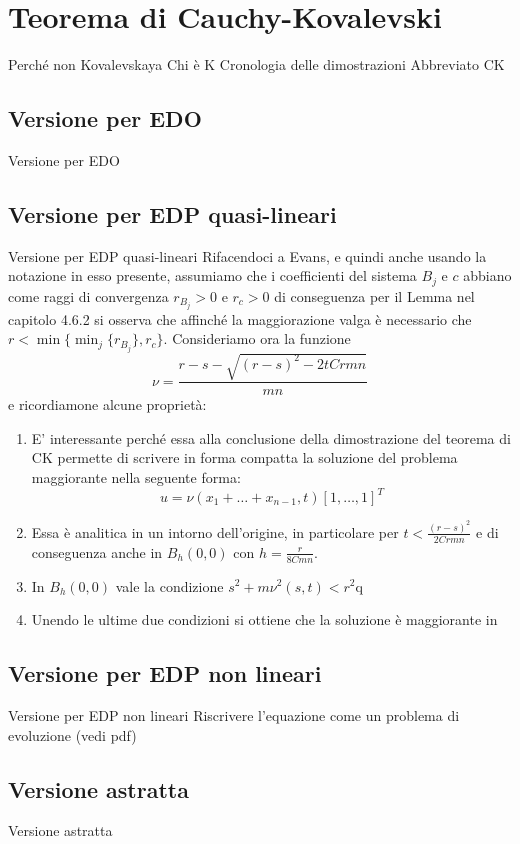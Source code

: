 \chapter{Teorema di Cauchy-Kovalevski}

Perché non Kovalevskaya
Chi è K
Cronologia delle dimostrazioni
Abbreviato CK
\section{Versione per EDO}
Versione per EDO
\section{Versione per EDP quasi-lineari}
Versione per EDP quasi-lineari
Rifacendoci a Evans, e quindi anche usando la notazione in esso presente, 
assumiamo che i coefficienti del sistema $B_j$ e $c$ abbiano come raggi di convergenza $r_{B_j}>0$ e $r_c>0$ 
di conseguenza per il Lemma nel capitolo 4.6.2 si osserva che affinché la maggiorazione valga è necessario 
che $r<\min\{\min_{j} \{r_{B_j}\}, r_c \}$.
Consideriamo ora la funzione $$\nu=\frac{r-s-\sqrt{(r-s)^2-2tCrmn}}{mn}$$ e ricordiamone alcune proprietà:
\begin{enumerate}[1.]

\item
E' interessante perché essa alla conclusione della dimostrazione del teorema di CK 
permette di scrivere in forma compatta la soluzione del problema maggiorante nella seguente forma: 
$$u = \nu(x_1+\ldots+x_{n-1}, t)[1,\ldots,1]^T$$

\item
Essa è analitica in un intorno dell'origine, in particolare per $t<\frac{(r-s)^2}{2Crmn}$ e di 
conseguenza anche in $B_h(0,0)$ con $h=\frac{r}{8Cmn}$.

\item
In $B_h(0,0)$ vale la condizione $s^2+m\nu ^2 (s,t)< r^2$q

\item
Unendo le ultime due condizioni si ottiene che la soluzione è maggiorante in 

\end{enumerate}

\section{Versione per EDP non lineari}
Versione per EDP non lineari
Riscrivere l'equazione come un problema di evoluzione (vedi pdf)
\section{Versione astratta}
Versione astratta

